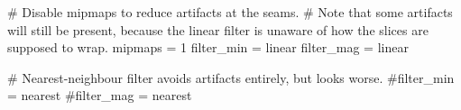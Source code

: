 
# Disable mipmaps to reduce artifacts at the seams.
# Note that some artifacts will still be present, because the linear filter is unaware of how the slices are supposed to wrap.
mipmaps = 1
filter_min = linear
filter_mag = linear

# Nearest-neighbour filter avoids artifacts entirely, but looks worse.
#filter_min = nearest
#filter_mag = nearest
